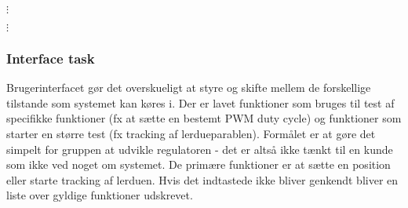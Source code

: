 
\(\vdots\)

\(\vdots\)


\subsubsection{Interface task}
\label{sec:interface}
Brugerinterfacet gør det overskueligt at styre og skifte mellem de forskellige tilstande som systemet kan køres i.
Der er lavet funktioner som bruges til test af specifikke funktioner (fx at sætte en bestemt PWM duty cycle)
og funktioner som starter en større test (fx tracking af lerdueparablen).
Formålet er at gøre det simpelt for gruppen at udvikle regulatoren -
det er altså ikke tænkt til en kunde som ikke ved noget om systemet.
De primære funktioner er at sætte en position eller starte tracking af lerduen.
Hvis det indtastede ikke bliver genkendt bliver en liste over gyldige funktioner udskrevet.

